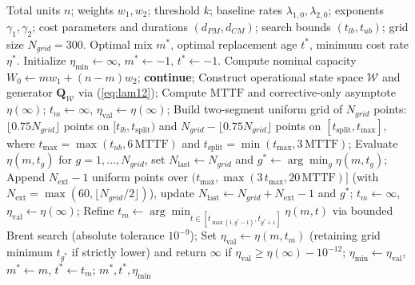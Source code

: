 \documentclass[10pt,a4paper]{article}
\begin{document}
\begin{algorithm}[htbp]
\caption{Two-stage grid-bracketed component-mix and age replacement optimization.}
\label{alg:opt}
\begin{algorithmic}[1]
\Require Total units $n$; weights $w_1, w_2$; threshold $k$; baseline rates $\lambda_{1,0}, \lambda_{2,0}$; exponents $\gamma_1, \gamma_2$; cost parameters and durations $(d_{PM}, d_{CM})$; search bounds $(t_{lb}, t_{ub})$; grid size $N_{grid} = 300$.
\Ensure Optimal mix $m^*$, optimal replacement age $t^*$, minimum cost rate $\eta^*$.
\State Initialize $\eta_{\min} \gets \infty$, $m^* \gets -1$, $t^* \gets -1$.
    \State Compute nominal capacity $W_0 \gets m w_1 + (n - m) w_2$;
     \textbf{continue}; \EndIf
    \State Construct operational state space $\mathcal{W}$ and generator $\mathbf{Q}_{\mathcal{W}}$ via (\ref{eq:lam12});
    \State Compute $\mathrm{MTTF}$ and corrective-only asymptote $\eta(\infty)$;
        \State $t_m \gets \infty$, $\eta_{\mathrm{val}} \gets \eta(\infty)$; 
    \Else
        \State Build two-segment uniform grid of $N_{grid}$ points: $\lfloor 0.75 N_{grid} \rfloor$ points on $[t_{lb}, t_{\mathrm{split}})$ and $N_{grid} - \lfloor 0.75 N_{grid} \rfloor$ points on $[t_{\mathrm{split}}, t_{\max}]$, where $t_{\max} = \max(t_{ub}, 6\,\mathrm{MTTF})$ and $t_{\mathrm{split}} = \min(t_{\max}, 3\,\mathrm{MTTF})$;
        \State Evaluate $\eta(m, t_g)$ for $g = 1, \dots, N_{grid}$, set $N_{\mathrm{last}} \gets N_{grid}$ and $g^* \gets \arg\min_{g} \eta(m, t_g)$;
            \State Append $N_{\mathrm{ext}} - 1$ uniform points over $(t_{\max}, \max(3\,t_{\max}, 20\,\mathrm{MTTF})]$ (with $N_{\mathrm{ext}} = \max(60, \lfloor N_{grid}/2 \rfloor)$), update $N_{\mathrm{last}} \gets N_{grid} + N_{\mathrm{ext}} - 1$ and $g^*$;
        \EndIf
            \State $t_m \gets \infty$, $\eta_{\mathrm{val}} \gets \eta(\infty)$;
        \Else
            \State Refine $t_m \gets \arg\min_{t \in [t_{\max(1, g^*-1)}, t_{g^*+1}]} \eta(m, t)$ via bounded Brent search (absolute tolerance $10^{-9}$);
            \State Set $\eta_{\mathrm{val}} \gets \eta(m, t_m)$ (retaining grid minimum $t_{g^*}$ if strictly lower) and return $\infty$ if $\eta_{\mathrm{val}} \ge \eta(\infty) - 10^{-12}$;
        \EndIf
    \EndIf
        \State $\eta_{\min} \gets \eta_{\mathrm{val}}$, $m^* \gets m$, $t^* \gets t_m$;
    \EndIf
\EndFor
\State \Return $m^*, t^*, \eta_{\min}$
\end{algorithmic}
\end{algorithm}
\end{document}
